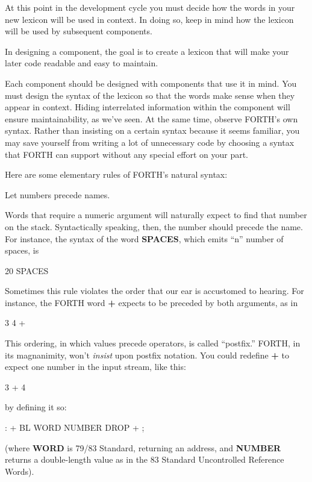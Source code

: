 At this point in the development cycle you must decide how the words in
your new lexicon will be used in context. In doing so, keep in mind how
the lexicon will be used by subsequent components.
\begin{tip}
In designing a component, the goal is to create a lexicon that will make your
later code readable and easy to maintain.
\end{tip}
Each component should be designed with components that use it in mind.
You must design the syntax of the lexicon so that the words make sense
when they appear in context. Hiding interrelated information within the
component will ensure maintainability, as we've seen.
At the same time, observe FORTH's own syntax. Rather than insisting
on a certain syntax because it seems familiar, you may save
yourself from writing a lot of unnecessary code by choosing a syntax that
FORTH can support without any special effort on your part.

Here are some elementary rules of FORTH's natural syntax:
\begin{tip}
Let numbers precede names.
\end{tip}
Words that require a numeric argument will naturally expect to find that
number on the stack. Syntactically speaking, then, the number should
precede the name. For instance, the syntax of the word \textbf{SPACES}, which
emits ``n'' number of spaces, is

\begin{Code}
20 SPACES
\end{Code}

Sometimes this rule violates the order that our ear is accustomed to
hearing. For instance, the FORTH word \textbf{+} expects to be preceded by both
arguments, as in

\begin{Code}
3 4 +
\end{Code}

This ordering, in which values precede operators, is called ``postfix.''
FORTH, in its magnanimity, won't \emph{insist} upon postfix notation.
You could redefine \textbf{+} to expect one number in the input stream, like this:

\begin{Code}
3 + 4
\end{Code}

by defining it so:
\begin{Code}
: +   BL WORD  NUMBER DROP  + ;
\end{Code}
(where \textbf{WORD} is 79/83 Standard, returning an address, and \textbf{NUMBER}
returns a double-length value as in the 83 Standard Uncontrolled
Reference Words).

